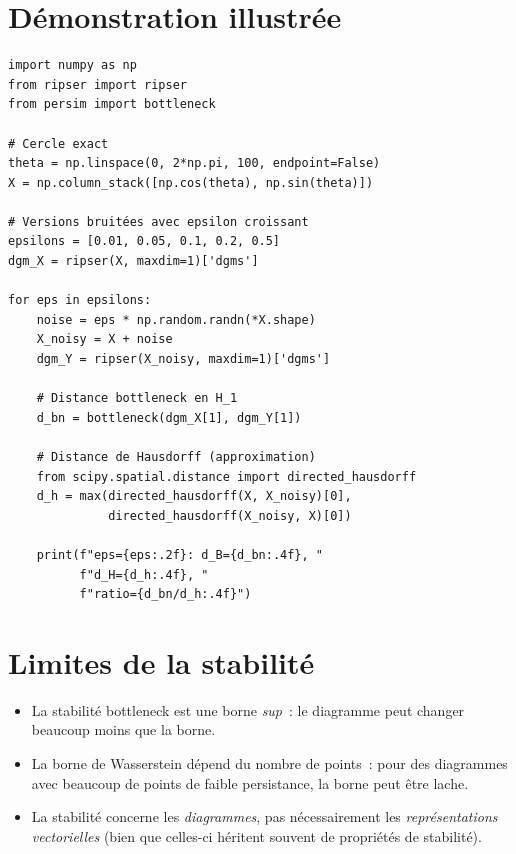 \section{D\'emonstration illustr\'ee}

\begin{codeblock}[title=\textbf{V\'erification num\'erique de la stabilit\'e}]
\begin{verbatim}
import numpy as np
from ripser import ripser
from persim import bottleneck

# Cercle exact
theta = np.linspace(0, 2*np.pi, 100, endpoint=False)
X = np.column_stack([np.cos(theta), np.sin(theta)])

# Versions bruitées avec epsilon croissant
epsilons = [0.01, 0.05, 0.1, 0.2, 0.5]
dgm_X = ripser(X, maxdim=1)['dgms']

for eps in epsilons:
    noise = eps * np.random.randn(*X.shape)
    X_noisy = X + noise
    dgm_Y = ripser(X_noisy, maxdim=1)['dgms']

    # Distance bottleneck en H_1
    d_bn = bottleneck(dgm_X[1], dgm_Y[1])

    # Distance de Hausdorff (approximation)
    from scipy.spatial.distance import directed_hausdorff
    d_h = max(directed_hausdorff(X, X_noisy)[0],
              directed_hausdorff(X_noisy, X)[0])

    print(f"eps={eps:.2f}: d_B={d_bn:.4f}, "
          f"d_H={d_h:.4f}, "
          f"ratio={d_bn/d_h:.4f}")
\end{verbatim}
\end{codeblock}

\section{Limites de la stabilit\'e}

\begin{attention}[title=\textbf{Limites}]
\begin{itemize}
  \item La stabilit\'e bottleneck est une borne \emph{sup}~: le
        diagramme peut changer beaucoup moins que la borne.
  \item La borne de Wasserstein d\'epend du nombre de points~: pour
        des diagrammes avec beaucoup de points de faible persistance,
        la borne peut \^etre lache.
  \item La stabilit\'e concerne les \emph{diagrammes}, pas
        n\'ecessairement les \emph{repr\'esentations vectorielles}
        (bien que celles-ci h\'eritent souvent de propri\'et\'es de
        stabilit\'e).
\end{itemize}
\end{attention}

